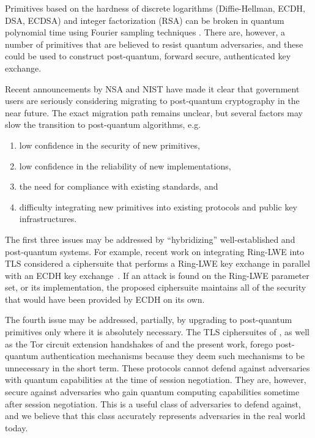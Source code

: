 \documentclass[USenglish,oneside,twocolumn]{article}
\theoremstyle{dgthm}
\theoremstyle{dgdef}
\begin{document}
  \noindent Primitives based on the hardness of discrete logarithms (Diffie-Hellman,
  ECDH, DSA, ECDSA) and integer factorization (RSA) can be broken in quantum
  polynomial time using Fourier sampling techniques \cite{Shor94,Boneh1995}.
  There are, however, a number of primitives that are believed to resist
  quantum adversaries, and these could be used to construct post-quantum,
  forward secure, authenticated key exchange.

  Recent announcements by NSA \cite{NSA} and NIST \cite{Chen2016} have made it
  clear that government users are seriously considering migrating to
  post-quantum cryptography in the near future. The exact migration path
  remains unclear, but several factors may slow the transition to post-quantum
  algorithms, e.g.
  \begin{enumerate}
    \item low confidence in the security of new primitives,
    \item low confidence in the reliability of new implementations,
    \item the need for compliance with existing standards, and
    \item difficulty integrating new primitives into existing protocols and
      public key infrastructures.
  \end{enumerate}
  The first three issues may be addressed by ``hybridizing'' well-established
  and post-quantum systems. For example, recent work on integrating Ring-LWE
  into TLS considered a ciphersuite that performs a Ring-LWE key exchange in
  parallel with an ECDH key exchange~\cite{Bos2015}.  If an attack is found on
  the Ring-LWE parameter set, or its implementation, the proposed ciphersuite
  maintains all of the security that would have been provided by ECDH on its
  own.

  The fourth issue may be addressed, partially, by upgrading to post-quantum
  primitives only where it is absolutely necessary. The TLS ciphersuites of
  \cite{Bos2015}, as well as the Tor circuit extension handshakes of
  \cite{GhoshK15} and the present work, forego post-quantum authentication
  mechanisms because they deem such mechanisms to be unnecessary in the short
  term.  These protocols cannot defend against adversaries with quantum
  capabilities at the time of session negotiation. They are, however, secure
  against adversaries who gain quantum computing capabilities sometime after
  session negotiation. This is a useful class of adversaries to defend against,
  and we believe that this class accurately represents adversaries in the real
  world today.
\end{document}
